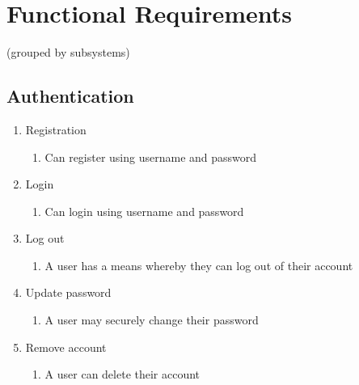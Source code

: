 \documentclass[12pt]{article}
\begin{document}
\newpage

\section{Functional Requirements}

 (grouped by subsystems)

\subsection{Authentication}
\begin{enumerate}
  \item Registration
        \begin{enumerate}
          \item Can register using username and password
        \end{enumerate}
  \item Login
        \begin{enumerate}
          \item Can login using username and password
        \end{enumerate}
  \item Log out
        \begin{enumerate}
          \item A user has a means whereby they can log out of their account
        \end{enumerate}
  \item Update password
        \begin{enumerate}
          \item A user may securely change their password
        \end{enumerate}
  \item Remove account
        \begin{enumerate}
          \item A user can delete their account
        \end{enumerate}
\end{enumerate}
\end{document}
